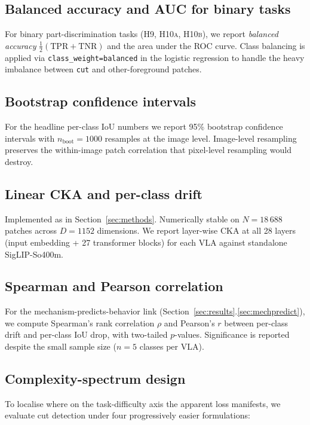 \documentclass[11pt]{article}
\begin{document}
\subsection{Balanced accuracy and AUC for binary tasks}

For binary part-discrimination tasks (\textsc{H9}, \textsc{H10a},
\textsc{H10b}), we report \emph{balanced accuracy}
$\frac{1}{2}(\mathrm{TPR} + \mathrm{TNR})$ and the area under the ROC
curve. Class balancing is applied via \verb|class_weight=balanced| in
the logistic regression to handle the heavy imbalance between
\texttt{cut} and other-foreground patches.

\subsection{Bootstrap confidence intervals}

For the headline per-class IoU numbers we report 95\% bootstrap
confidence intervals with $n_{\mathrm{boot}} = 1000$ resamples at the
image level. Image-level resampling preserves the within-image patch
correlation that pixel-level resampling would destroy.

\subsection{Linear CKA and per-class drift}

Implemented as in Section~\ref{sec:methods}. Numerically stable on
$N = 18\,688$ patches across $D = 1152$ dimensions. We report layer-wise
CKA at all 28 layers (input embedding + 27 transformer blocks) for
each VLA against standalone SigLIP-So400m.

\subsection{Spearman and Pearson correlation}

For the mechanism-predicts-behavior link
(Section~\ref{sec:results}.\ref{sec:mechpredict}), we compute Spearman's
rank correlation $\rho$ and Pearson's $r$ between per-class drift and
per-class IoU drop, with two-tailed $p$-values. Significance is
reported despite the small sample size ($n = 5$ classes per VLA).

\subsection{Complexity-spectrum design}

To localise where on the task-difficulty axis the apparent loss
manifests, we evaluate cut detection under four progressively easier
formulations:
\end{document}
